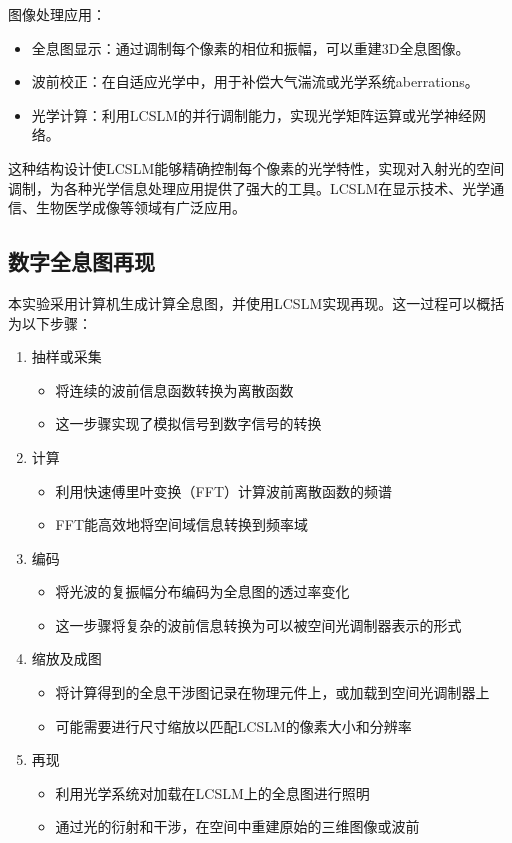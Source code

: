 \documentclass[11pt,a4paper]{article}
\begin{document}
图像处理应用：
\begin{itemize}
    \item 全息图显示：通过调制每个像素的相位和振幅，可以重建3D全息图像。
    \item 波前校正：在自适应光学中，用于补偿大气湍流或光学系统aberrations。
    \item 光学计算：利用LCSLM的并行调制能力，实现光学矩阵运算或光学神经网络。
\end{itemize}
这种结构设计使LCSLM能够精确控制每个像素的光学特性，实现对入射光的空间调制，为各种光学信息处理应用提供了强大的工具。LCSLM在显示技术、光学通信、生物医学成像等领域有广泛应用。

\subsection{数字全息图再现}
本实验采用计算机生成计算全息图，并使用LCSLM实现再现。这一过程可以概括为以下步骤：
\begin{enumerate}
\item 抽样或采集
\begin{itemize}
\item 将连续的波前信息函数转换为离散函数
\item 这一步骤实现了模拟信号到数字信号的转换
\end{itemize}
\item 计算
\begin{itemize}
\item 利用快速傅里叶变换（FFT）计算波前离散函数的频谱
\item FFT能高效地将空间域信息转换到频率域
\end{itemize}
\item 编码
\begin{itemize}
\item 将光波的复振幅分布编码为全息图的透过率变化
\item 这一步骤将复杂的波前信息转换为可以被空间光调制器表示的形式
\end{itemize}
\item 缩放及成图
\begin{itemize}
\item 将计算得到的全息干涉图记录在物理元件上，或加载到空间光调制器上
\item 可能需要进行尺寸缩放以匹配LCSLM的像素大小和分辨率
\end{itemize}
\item 再现
\begin{itemize}
\item 利用光学系统对加载在LCSLM上的全息图进行照明
\item 通过光的衍射和干涉，在空间中重建原始的三维图像或波前
\end{itemize}
\end{enumerate}
\end{document}

